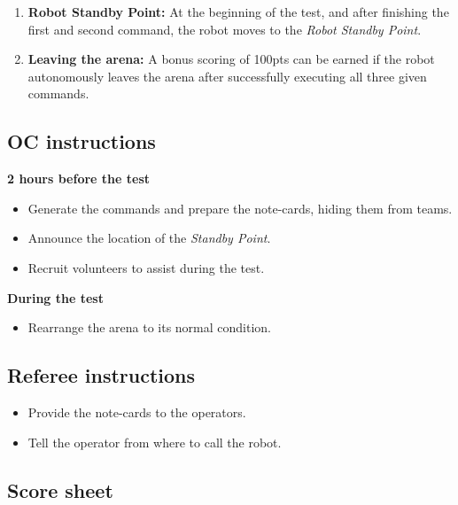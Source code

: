 \begin{enumerate}[nosep]
	\item \textbf{Robot Standby Point:} At the beginning of the test, and after finishing the first and second command, the robot moves to the \textit{Robot Standby Point}.

	\item \textbf{Leaving the arena:} A bonus scoring of 100pts can be earned if the robot autonomously leaves the arena after successfully executing all three given commands.
\end{enumerate}

\subsection*{OC instructions}

\textbf{2 hours before the test}
\begin{itemize}
	\item Generate the commands and prepare the note-cards, hiding them from teams.
	\item Announce the location of the \emph{Standby Point}.
	\item Recruit volunteers to assist during the test.
\end{itemize}

\textbf{During the test}
\begin{itemize}[nosep]
	\item Rearrange the arena to its normal condition.
\end{itemize}

\subsection*{Referee instructions}
\begin{itemize}
	\item Provide the note-cards to the operators.
	\item Tell the operator from where to call the robot.
\end{itemize}

\subsection*{Score sheet}


